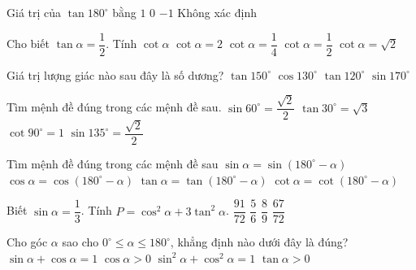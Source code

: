 \begin{ex}
	Giá trị của $\tan180^\circ$ bằng
	\choice
	{$1$}
	{\True $0$}
	{$-1$}
	{Không xác định}
\end{ex}
\begin{ex}
	Cho biết $\tan\alpha=\dfrac{1}{2}$. Tính $\cot\alpha$
	\choice
	{\True $\cot\alpha=2$}
	{$\cot\alpha=\dfrac{1}{4}$}
	{$\cot\alpha=\dfrac{1}{2}$}
	{$\cot\alpha=\sqrt{2}$}
\end{ex}
\begin{ex}
	Giá trị lượng giác nào sau đây là số dương?
	\choice
	{$\tan 150^\circ$}
	{$\cos 130^\circ$}
	{$\tan 120^\circ$}
	{\True $\sin 170^\circ$}
\end{ex} 
\begin{ex}
	Tìm mệnh đề đúng trong các mệnh đề sau.
	\choice
	{$\sin 60^\circ=\dfrac{\sqrt{2}}{2}$}
	{$\tan 30^\circ=\sqrt{3}$}
	{$\cot 90^\circ=1$}
	{\True $\sin 135^\circ=\dfrac{\sqrt{2}}{2}$}
\end{ex}
\begin{ex}
	Tìm mệnh đề đúng trong các mệnh đề sau
	\choice
	{\True $\sin\alpha=\sin(180^\circ-\alpha)$}
	{$\cos\alpha=\cos(180^\circ-\alpha)$}
	{$\tan\alpha=\tan(180^\circ-\alpha)$}
	{$\cot\alpha=\cot(180^\circ-\alpha)$}
\end{ex}
\begin{ex}
	Biết $\sin\alpha=\dfrac{1}{3}$. Tính $P=\cos^2\alpha+3\tan^2\alpha$.
	\choice
	{\True $\dfrac{91}{72}$}
	{$\dfrac{5}{6}$}
	{$\dfrac{8}{9}$}
	{$\dfrac{67}{72}$}
\end{ex}
\begin{ex}
	Cho góc $\alpha$ sao cho $0^\circ\leq\alpha\leq 180^\circ$, khẳng định nào dưới đây là đúng?
	\choice
	{$\sin\alpha+\cos\alpha=1$}
	{$\cos\alpha>0$}	
	{\True $\sin^2\alpha+\cos^2\alpha=1$}
	{$\tan\alpha>0$} 
\end{ex}
